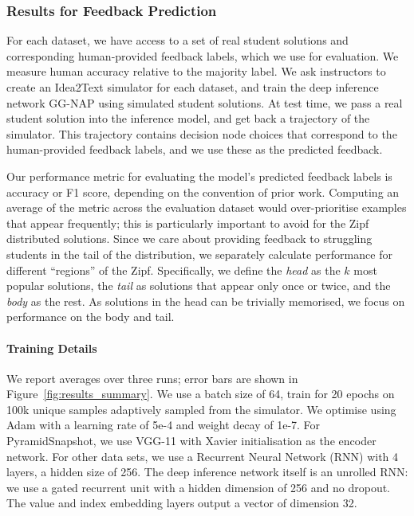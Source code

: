 \subsubsection{Results for Feedback Prediction}
\label{sec:results}
For each dataset, we have access to a set of real student solutions and corresponding human-provided feedback labels, which we use for evaluation. We measure human accuracy relative to the majority label.
We ask instructors to create an Idea2Text simulator for each dataset, and train the deep inference network GG-NAP using simulated student solutions. At test time, we pass a real student solution into the inference model, and get back a trajectory of the simulator. This trajectory contains decision node choices that correspond to the human-provided feedback labels, and we use these as the predicted feedback.

Our performance metric for evaluating the model's predicted feedback labels is accuracy or F1 score, depending on the convention of prior work. Computing an average of the metric across the evaluation dataset would over-prioritise examples that appear frequently; this is particularly important to avoid for the Zipf distributed solutions. Since we care about providing feedback to struggling students in the tail of the distribution, we separately calculate performance for different ``regions'' of the Zipf.  Specifically, we define the \textit{head} as the $k$ most popular solutions, the \textit{tail} as solutions that appear only once or twice, and the \textit{body} as the rest. As solutions in the head can be trivially memorised, we focus on performance on the body and tail.

\paragraph{Training Details} 
We report averages over three runs; error bars are shown in Figure~\ref{fig:results_summary}.
We use a batch size of 64, train for 20 epochs on 100k unique samples adaptively sampled from the simulator. We optimise using Adam \cite{kingma2014adam} with a learning rate of 5e-4 and weight decay of 1e-7. For PyramidSnapshot, we use VGG-11 \cite{simonyan2014very} with Xavier initialisation \cite{glorot2010understanding} as the encoder network. For other data sets, we use a Recurrent Neural Network (RNN) with 4 layers, a hidden size of 256. The deep inference network itself is an unrolled RNN: we use a gated recurrent unit with a hidden dimension of 256 and no dropout. The value and index embedding layers output a vector of dimension 32. 

